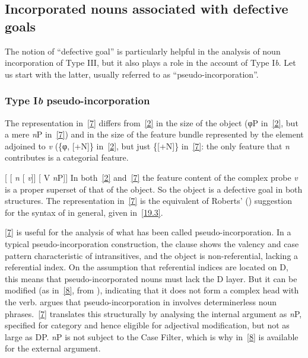 \documentclass[output=paper]{langsci/langscibook}
\begin{document}
\begin{refcontext}
\subsection{Incorporated nouns associated with defective goals}
\label{2.1}

The notion of \enquote{defective goal} is particularly helpful in the analysis of
noun incorporation of Type III, but it also plays a role in the account of Type
I\emph{b}. Let us start with the latter, usually referred to as
\enquote{pseudo-incorporation}.

\subsubsection{Type I\emph{b} pseudo-incorporation}

The representation in~\eqref{7} differs from~\eqref{2} in the size of the
object (φ{}P in~\eqref{2}, but a mere \emph{n}P in~\eqref{7}) and in the size
of the feature bundle represented by the element adjoined to
\emph{v} (\{φ{}, [+N]\} in~\eqref{2}, but just \{[+N]\} in~\eqref{7}: the only
feature that \emph{n} contributes is a categorial feature.

\ea {}[ [ \emph{n}\tss{\{[+N]\}} [ \hspace{-1ex}\emph{v}\tss{\{[+V], \Acc{}, \ldots{}\}}]] [ V \emph{n}P\tss{\{[+N]\}}]] \label{7}
\z
In both~\eqref{2} and~\eqref{7} the feature content of the complex probe \emph{v}
is a proper superset of that of the object. So the object is a defective goal
in both structures. The representation in~\eqref{7} is the equivalent of Roberts'
(\citeyear{Roberts2010}) suggestion for the syntax of  in
general, given in~\eqref{19.3}.

\eqref{7} is useful for the analysis of what has been called
pseudo-incorporation. In a typical pseudo-incorporation construction, the
clause shows the valency and case pattern characteristic of intransitives, and
the object is non-referential, lacking a referential index. On the assumption
that referential indices are located on D, this means that pseudo-incorporated
nouns must lack the D layer. But it can be modified (as in~\eqref{8}, from
), indicating that it does not form a complex head with the verb.
\cite{massam01} argues that pseudo-incorporation in  involves
determinerless noun phrases.~\eqref{7} translates this structurally by analysing
the internal argument as \emph{n}P, specified for category and hence eligible
for adjectival modification, but not as large as DP. \emph{n}P is not subject
to the Case Filter, which is why in~\eqref{8}  is available for
the external argument.


\end{refcontext}
\end{document}
